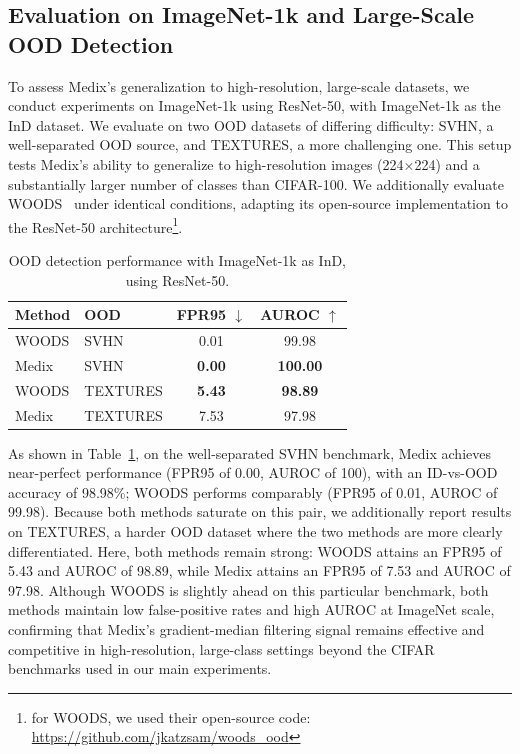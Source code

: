 \documentclass[10pt]{article} %
\theoremstyle{plain}
\theoremstyle{definition}
\begin{document}
\subsection{Evaluation on ImageNet-1k and Large-Scale OOD Detection}
\label{appendix:imagenet_experiment}
To assess Medix's generalization to high-resolution, large-scale datasets, we conduct experiments on ImageNet-1k using ResNet-50, with ImageNet-1k as the InD dataset. We evaluate on two OOD datasets of differing difficulty: SVHN, a well-separated OOD source, and TEXTURES, a more challenging one. This setup tests Medix's ability to generalize to high-resolution images (224$\times$224) and a substantially larger number of classes than CIFAR-100. We additionally evaluate WOODS~\citep{pmlr-v162-katz-samuels22a} under identical conditions, adapting its open-source implementation to the ResNet-50 architecture\footnote{for WOODS, we used their open-source code: \url{https://github.com/jkatzsam/woods_ood}}.

\begin{table}
\vspace{-10pt}
\centering
\caption{OOD detection performance with ImageNet-1k as InD, using ResNet-50.}
\footnotesize
\begin{tabular}{l l c c}
\toprule
\textbf{Method} & \textbf{OOD} & \textbf{FPR95} $\downarrow$ & \textbf{AUROC} $\uparrow$ \\
\midrule
WOODS & SVHN     & 0.01 & 99.98 \\
Medix & SVHN     & \textbf{0.00} & \textbf{100.00} \\
WOODS & TEXTURES & \textbf{5.43} & \textbf{98.89} \\
Medix & TEXTURES & 7.53 & 97.98 \\
\bottomrule
\end{tabular}
\vspace{-10pt}
\label{tab:imagenet_ood}
\end{table}
As shown in Table~\ref{tab:imagenet_ood}, on the well-separated SVHN benchmark, Medix achieves near-perfect performance (FPR95 of 0.00, AUROC of 100), with an ID-vs-OOD accuracy of 98.98\%; WOODS performs comparably (FPR95 of 0.01, AUROC of 99.98). Because both methods saturate on this pair, we additionally report results on TEXTURES, a harder OOD dataset where the two methods are more clearly differentiated. Here, both methods remain strong: WOODS attains an FPR95 of 5.43 and AUROC of 98.89, while Medix attains an FPR95 of 7.53 and AUROC of 97.98. Although WOODS is slightly ahead on this particular benchmark, both methods maintain low false-positive rates and high AUROC at ImageNet scale, confirming that Medix's gradient-median filtering signal remains effective and competitive in high-resolution, large-class settings beyond the CIFAR benchmarks used in our main experiments.
\end{document}
